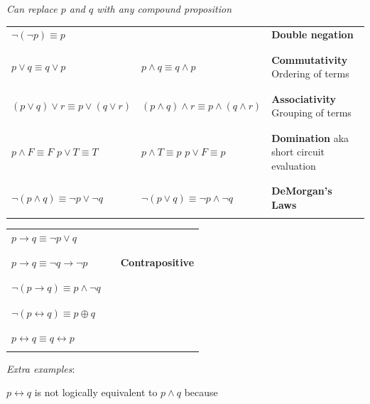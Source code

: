 \documentclass[12pt, oneside]{article}
\begin{document}
{\it Can replace $p$ and $q$ with any compound proposition}

\begin{tabular}{llp{3in}}
$\lnot ( \lnot p) \equiv p$ & & {\bf Double negation}\\
&& \\
&& \\
$p \lor q \equiv q \lor p$ & $p \land q \equiv q \land p$ & {\bf Commutativity} Ordering of terms\\
&& \\
&& \\
$(p \lor q) \lor r  \equiv p \lor (q \lor r)$ & $(p \land q) \land r  \equiv p \land (q \land r)$ & {\bf Associativity} Grouping of terms\\
&& \\
&& \\
$p \land F \equiv F$ \qquad $p \lor T \equiv T$ & $p \land T \equiv p$ \qquad $p \lor F \equiv p$ & {\bf Domination} aka 
short circuit evaluation\\
&& \\
&& \\
$\lnot (p \land q) \equiv \lnot p \lor \lnot q$ & $\lnot (p \lor q) \equiv \lnot p \land\lnot q$  & {\bf DeMorgan's Laws}\\
&& \\
\end{tabular}

\begin{tabular}{llp{3in}}
$p \to q \equiv \lnot p \lor q$ & & \\
&& \\
&& \\
$p \to q \equiv \lnot q \to \lnot p$ & &{\bf Contrapositive} \\
&& \\
&& \\
$\lnot (p \to q) \equiv p\land \lnot q$  & &\\
&& \\
&& \\
$\lnot( p \leftrightarrow q) \equiv p \oplus q$ && \\
&& \\
&& \\
$p \leftrightarrow q \equiv q \leftrightarrow p$ &&\\
&& \\
\end{tabular}

{\it Extra examples}:

$p \leftrightarrow q$ is not logically equivalent to $p \land q$ because \underline{\phantom{\hspace{4in}}} 
\end{document}

